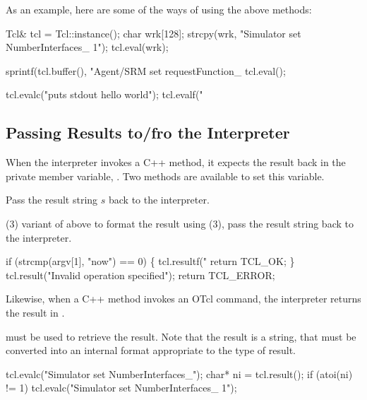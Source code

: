 As an example, here are some of the ways of using the above methods:
\begin{program}
        Tcl& tcl = Tcl::instance();
        char wrk[128];
        strcpy(wrk, "Simulator set NumberInterfaces_ 1");
        tcl.eval(wrk);

        sprintf(tcl.buffer(), "Agent/SRM set requestFunction_ %
        tcl.eval();

        tcl.evalc("puts stdout {hello world}");
        tcl.evalf("%
\end{program}

\subsection{Passing Results to/fro the Interpreter}
\label{sec:Result}

When the interpreter invokes a C++ method,
it expects the result back in the private member variable,
.
Two methods are available to set this variable.
\begin{list}{\textbullet}{}
\item {}

        Pass the result string $s$ back to the interpreter.
\item

        (3) variant of above
        to format the result using (3),
        pass the result string back to the interpreter.
\end{list}
\begin{program}
        if (strcmp(argv[1], "now") == 0) \{
                tcl.resultf("%
                return TCL_OK;
        \}
        tcl.result("Invalid operation specified");
        return TCL_ERROR;
\end{program}

Likewise, when a C++ method invokes an OTcl command,
the interpreter returns the result in .
\begin{list}{\textbullet}{}
\item {}
      must be used to retrieve the result.
      Note that the result is a string, that must be converted
      into an internal format appropriate to the type of result.
\end{list}
\begin{program}
        tcl.evalc("Simulator set NumberInterfaces_");
        char* ni = tcl.result();
        if (atoi(ni) != 1)
                tcl.evalc("Simulator set NumberInterfaces_ 1");
\end{program}
        
